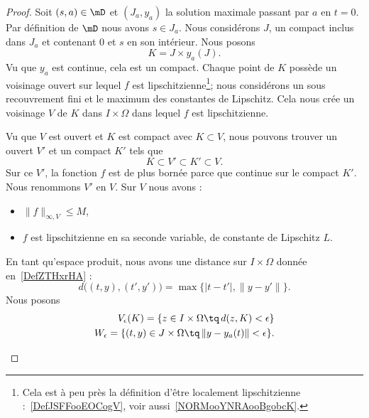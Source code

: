 \begin{proof}
	Soit \( (s,a)\in\mD\) et \( (J_a,y_a)\) la solution maximale passant par \( a\) en \( t=0\). Par définition de \( \mD\) nous avons \( s\in J_a\). Nous considérons \( J\), un compact inclus dans \( J_a\) et contenant \( 0\) et \( s\) en son intérieur. Nous posons
	\begin{equation}
		K=J\times y_a(J).
	\end{equation}
	Vu que \( y_a\) est continue, cela est un compact. Chaque point de \( K\) possède un voisinage ouvert sur lequel \( f\) est lipschitzienne\footnote{Cela est à peu près la définition d'être localement lipschitzienne :~\ref{DefJSFFooEOCogV}, voir aussi~\ref{NORMooYNRAooBgobcK}.}; nous considérons un sous recouvrement fini et le maximum des constantes de Lipschitz. Cela nous crée un voisinage \( V\) de \( K\) dans \( I\times \Omega\) dans lequel \( f\) est lipschitzienne.

	Vu que \( V\) est ouvert et \( K\) est compact avec \( K\subset V\), nous pouvons trouver un ouvert \( V'\) et un compact \( K'\) tels que
	\begin{equation}
		K\subset V'\subset K'\subset V.
	\end{equation}
	Sur ce \( V'\), la fonction \( f\) est de plus bornée parce que continue sur le compact \( K'\). Nous renommons \( V'\) en \( V\). Sur \( V\) nous avons :
	\begin{itemize}
		\item \( \| f \|_{\infty,V}\leq M\),
		\item \( f\) est lipschitzienne en sa seconde variable, de constante de Lipschitz \( L\).
	\end{itemize}


	En tant qu'espace produit, nous avons une distance sur \( I\times \Omega\) donnée en~\ref{DefZTHxrHA} :
	\begin{equation}
		d\big( (t,y),(t',y') \big)=\max\big\{  | t-t' |,\| y-y' \|   \big\}.
	\end{equation}
	Nous posons
	\begin{subequations}
		\begin{align}
			V_{\epsilon}(K)=\{ z\in I\times \Omega \tq\,d(z,K)<\epsilon  \} \\
			W_{\epsilon}=\{ (t,y)\in J\times \Omega\tq\,\| y- y_a(t) \|<\epsilon \}.
		\end{align}
	\end{subequations}

	\begin{subproof}


\end{subproof}
\end{proof}
